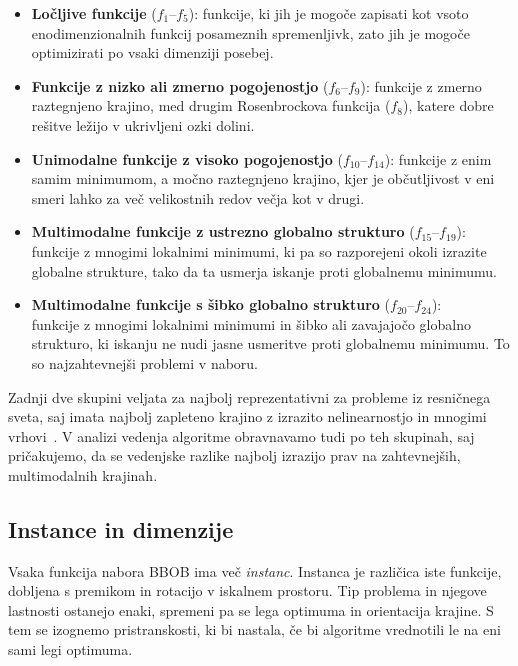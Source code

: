 \documentclass[a4paper, 12pt]{book}
\begin{document}
\begin{itemize}
    \item \textbf{Ločljive funkcije} ($f_1$--$f_5$): funkcije, ki jih je mogoče
    zapisati kot vsoto enodimenzionalnih funkcij posameznih spremenljivk, zato
    jih je mogoče optimizirati po vsaki dimenziji posebej.

    \item \textbf{Funkcije z nizko ali zmerno pogojenostjo} ($f_6$--$f_9$):
    funkcije z zmerno raztegnjeno krajino, med drugim Rosenbrockova funkcija
    ($f_8$), katere dobre rešitve ležijo v ukrivljeni ozki dolini.

    \item \textbf{Unimodalne funkcije z visoko pogojenostjo}
    ($f_{10}$--$f_{14}$): funkcije z enim samim minimumom, a močno raztegnjeno
    krajino, kjer je ob\-čut\-lji\-vost v eni smeri lahko za več velikostnih redov
    večja kot v drugi.

    \item \textbf{Multimodalne funkcije z ustrezno globalno strukturo}
    ($f_{15}$--$f_{19}$): funkcije z mnogimi lokalnimi minimumi, ki pa so
    razporejeni okoli izrazite globalne strukture, tako da ta usmerja iskanje
    proti globalnemu minimumu. 

    \item \textbf{Multimodalne funkcije s šibko globalno strukturo}
    ($f_{20}$--$f_{24}$):\\ funkcije z mnogimi lokalnimi minimumi in šibko ali
    zavajajočo globalno strukturo, ki iskanju ne nudi jasne usmeritve proti
    globalnemu minimumu. To so najzahtevnejši problemi v naboru.
\end{itemize}

Zadnji dve skupini veljata za najbolj reprezentativni za probleme iz res\-nič\-ne\-ga
sveta, saj imata najbolj zapleteno krajino z izrazito nelinearnostjo in mnogimi
vrhovi~\cite{bbob2019}. V analizi vedenja algoritme obravnavamo tudi po teh
skupinah, saj pričakujemo, da se vedenjske razlike najbolj izrazijo prav na
zahtevnejših, multimodalnih krajinah.

\subsection{Instance in dimenzije}

Vsaka funkcija nabora BBOB ima več \emph{instanc}. Instanca je različica iste
funkcije, dobljena s premikom in rotacijo v iskalnem prostoru. Tip problema in
njegove lastnosti ostanejo enaki, spremeni pa se lega optimuma in orientacija
krajine. S tem se izognemo pristranskosti, ki bi nastala, če bi algoritme
vrednotili le na eni sami legi optimuma.
\end{document}
